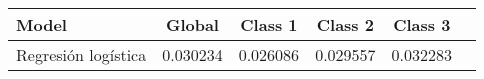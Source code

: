 \begin{tabular}{p{3cm}|c|c|c|c|c}
\toprule
               Model &   Global &  Class 1 &  Class 2 &  Class 3 \\
\midrule
 Regresión logística & 0.030234 & 0.026086 & 0.029557 & 0.032283 \\
\bottomrule
\end{tabular}
